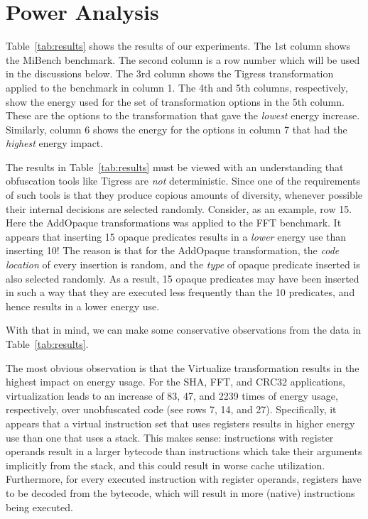 \section{Power Analysis}
\label{sec:analysis}


Table~\ref{tab:results} shows the results of our experiments. The 1st column shows the MiBench benchmark. The second column is a row number which will be used in the discussions below. The 3rd column shows the Tigress transformation applied to the benchmark in column 1. The 4th and 5th columns, respectively, show the energy used for the set of transformation options in the 5th column. These are the options to the transformation that gave the {\em lowest} energy increase. Similarly, column 6 shows the energy for the options in column 7 that had the {\em highest} energy impact.

The results in Table~\ref{tab:results} must be viewed with an understanding that obfuscation tools like Tigress are {\em not} deterministic. Since one of the requirements of such tools is that they produce copious amounts of diversity, whenever possible their internal decisions are selected randomly. Consider, as an example, row 15. Here the AddOpaque transformations was applied to the FFT benchmark. It appears that inserting 15 opaque predicates results in a {\em lower} energy use than inserting 10! The reason is that for the AddOpaque transformation, the {\em code location} of every insertion is random, and the {\em type} of opaque predicate inserted is also selected randomly. As a result, 15 opaque predicates may have been inserted in such a way that they are executed less frequently than the 10 predicates, and hence results in a lower energy use.

With that in mind, we can make some conservative observations from the data in Table~\ref{tab:results}.

The most obvious observation is that the Virtualize transformation results in the highest impact on energy usage. For the  SHA, FFT, and CRC32 applications, virtualization leads to an increase of 83, 47, and 2239 times of energy usage, respectively, over unobfuscated code (see rows 7, 14, and 27). Specifically, it appears that a virtual instruction set that uses registers results in higher energy use than one that uses a stack. This makes sense: instructions with register operands result in a larger bytecode than instructions which take their arguments implicitly from the stack, and this could result in worse cache utilization. Furthermore, for every executed instruction with register operands, registers have to be decoded from the bytecode, which will result in more (native) instructions being executed.

